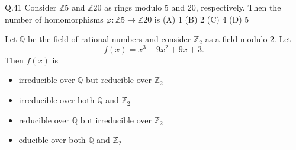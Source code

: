 \documentclass{article}
\begin{document}
																																				 Q.41 \quad  Consider $\mathbb{Z}5$ and $\mathbb{Z}{20}$ as rings modulo 5 and 20, respectively. Then the number of homomorphisms $\varphi: \mathbb{Z}5 \to \mathbb{Z}{20}$ is
																																				 \newline
																																				 (A) 1 \hspace{2cm}(B) 2 \hspace{2cm} (C) 4 \hspace{2cm} (D) 5


																																				 Let $\mathbb{Q}$ be the field of rational numbers and consider $\mathbb{Z}_2$ as a field modulo 2. Let
																																				     \[
																																				         f(x) = x^3 - 9x^2 + 9x + 3.
																																					     \]
																																					         Then $f(x)$ is
																																						     \begin{itemize}
																																						       \item[(A)] irreducible over $\mathbb{Q}$ but reducible over $\mathbb{Z}_2$
																																						         \item[(B)] irreducible over both $\mathbb{Q}$ and $\mathbb{Z}_2$
																																							   \item[(C)] reducible over $\mathbb{Q}$ but irreducible over $\mathbb{Z}_2$
																																							     \item[(D)] educible over both $\mathbb{Q}$ and $\mathbb{Z}_2$
																																							       \end{itemize}


																																							       \vspace{0.5em}
\end{document}
